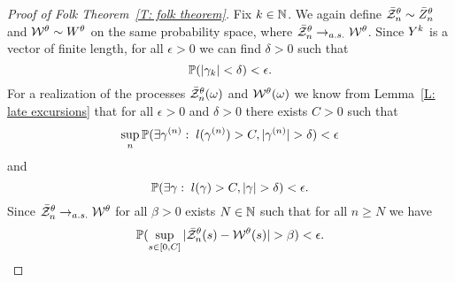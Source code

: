 \begin{proof}[Proof of Folk Theorem~\ref{T: folk theorem}]
	Fix $k \in \mathbb{N}$. 
	We again define $\bar{\mathcal{Z}}^{\theta}_n \sim \bar{Z}^{\theta}_n$ and $\mathcal{W}^{\theta} \sim W^{\theta}$ on the same probability space,
	where $\bar{\mathcal{Z}}^{\theta}_n \rightarrow_{a.s.} \mathcal{W}^{\theta}$.
	Since ${Y}^k$ is a vector of finite length, for all $\epsilon > 0$ we can find $\delta > 0$ such that
	\begin{equation} \label{E: folk theorem cond bm1}
		\mathbb{P}(|\gamma_k| < \delta) < \epsilon.
	\end{equation}
	For a realization of the processes $\bar{\mathcal{Z}}^{\theta}_n(\omega)$ and $\mathcal{W}^{\theta}(\omega)$ we know from Lemma~\ref{L: late excursions}
	that for all $\epsilon> 0$ and $\delta > 0$ there exists $C > 0$ such that
	\begin{equation} \label{E: folk theorem cond znt}
		\sup_n \mathbb{P}( \exists \gamma^{(n)}: \; l(\gamma^{(n)}) > C, |\gamma^{(n)}| > \delta ) < \epsilon
	\end{equation}
	and
	\begin{equation} \label{E: folk theorem cond bm2}
		\mathbb{P}(\exists \gamma: \; l(\gamma) > C, |\gamma| > \delta) < \epsilon.
	\end{equation}
	Since $\bar{\mathcal{Z}}^{\theta}_n \rightarrow_{a.s.} \mathcal{W}^{\theta}$ for all $\beta > 0$ exists $N \in \mathbb{N}$ such that for all $n \geq N$ we have
	\begin{equation} \label{E: folk theorem cond sup}
		\mathbb{P}( \sup_{s \in [0, C]} |\bar{\mathcal{Z}}^{\theta}_n(s) - \mathcal{W}^{\theta}(s)| > \beta ) < \epsilon.
	\end{equation}
	

\end{proof}
